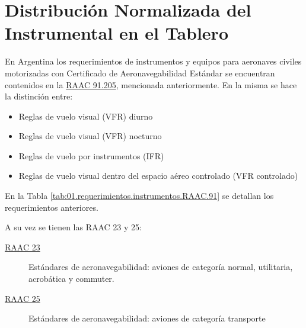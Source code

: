 
  
  


\section{Distribuci\'on Normalizada del Instrumental en el Tablero}
\label{sec:U01.03.distribucion.normalizada.instrumental}


En Argentina los requerimientos de instrumentos y equipos para aeronaves  civiles  motorizadas  con  Certificado de Aeronavegabilidad Estándar se encuentran contenidos en la \href{}{RAAC 91.205}, mencionada anteriormente.
En la misma se hace la distinci\'on entre:

\begin{itemize}
    \item Reglas de vuelo visual (VFR) diurno
    \item Reglas  de  vuelo  visual  (VFR)  nocturno
    \item Reglas de vuelo por instrumentos (IFR)
    \item Reglas de vuelo visual dentro del espacio aéreo controlado (VFR controlado)
\end{itemize}

En la Tabla \ref{tab:01.requerimientos.instrumentos.RAAC.91} se detallan los requerimientos anteriores.


A su vez se tienen las RAAC 23 y 25:

\begin{description}
\item[\href{https://www.anac.gov.ar/anac/web/uploads/upcg/raac/raac-23.pdf}{RAAC 23}] Estándares de aeronavegabilidad: aviones de categoría normal, utilitaria, acrobática y commuter.
\item[\href{https://www.anac.gov.ar/anac/web/uploads/upcg/raac/raac-25.pdf}{RAAC 25}]  Estándares de aeronavegabilidad: aviones de categoría transporte
\end{description}

